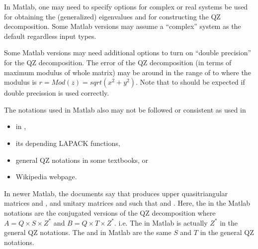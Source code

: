 In Matlab,
one may need to specify options for complex or real systems
be used for obtaining the (generalized) eigenvalues and
for constructing the QZ decomposition.
Some Matlab versions may assume a ``complex'' system as the default
regardless input types.

Some Matlab versions may need additional options to turn on
``double precision'' for the QZ decomposition.
The error of the QZ decomposition
(in terms of maximum modulus of whole matrix)
may be around in the range of  to 
where the modulus is $r = Mod(z) = sqrt(x^2 + y^2)$.
Note that  to  should be expected if
double precission is used correctly.

The notations used in Matlab also may not be followed or consistent
as used in
\begin{itemize}
\item {} in ,
\item its depending LAPACK functions,
\item general QZ notations in some textbooks, or
\item Wikipedia webpage.
\end{itemize}
In newer Matlab, the documents say that
produces upper quasitriangular matrices  and ,
and unitary matrices  and  such that
 and .
Here, the  in the Matlab notations
are the conjugated versions of the QZ decomposition
where $A = Q \times S \times Z^{*}$ and $B = Q \times T \times Z^{*}$.
i.e. The  in Matlab is actually $Z^{*}$ in the general QZ notations.
The  and  in Matlab are the same $S$ and $T$ in the
general QZ notations.
